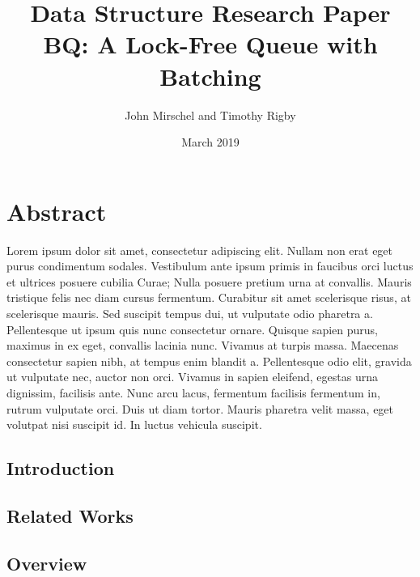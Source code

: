 \documentclass[12pt]{report}
\title{Data Structure Research Paper \\
    \large BQ: A Lock-Free Queue with Batching
}
\author{John Mirschel and Timothy Rigby}
\date{March 2019}
\begin{document}
\maketitle


\chapter*{Abstract}
Lorem ipsum dolor sit amet, consectetur adipiscing elit. Nullam non erat eget purus condimentum sodales. Vestibulum ante ipsum primis in faucibus orci luctus et ultrices posuere cubilia Curae; Nulla posuere pretium urna at convallis. Mauris tristique felis nec diam cursus fermentum. Curabitur sit amet scelerisque risus, at scelerisque mauris. Sed suscipit tempus dui, ut vulputate odio pharetra a. Pellentesque ut ipsum quis nunc consectetur ornare. Quisque sapien purus, maximus in ex eget, convallis lacinia nunc. Vivamus at turpis massa. Maecenas consectetur sapien nibh, at tempus enim blandit a. Pellentesque odio elit, gravida ut vulputate nec, auctor non orci. Vivamus in sapien eleifend, egestas urna dignissim, facilisis ante. Nunc arcu lacus, fermentum facilisis fermentum in, rutrum vulputate orci. Duis ut diam tortor. Mauris pharetra velit massa, eget volutpat nisi suscipit id. In luctus vehicula suscipit.
\newpage

\section{Introduction}


\section{Related Works}


\section{Overview}

\printbibliography
\end{document}
